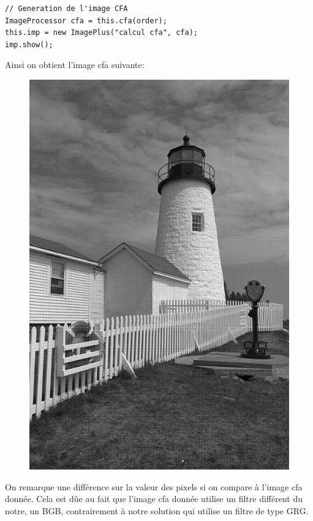 \documentclass[a4paper,12pt]{report}
\begin{document}
\begin{lstlisting}[style=Java]
// Generation de l'image CFA
ImageProcessor cfa = this.cfa(order);
this.imp = new ImagePlus("calcul cfa", cfa);
imp.show();
\end{lstlisting}

Ainsi on obtient l'image cfa suivante:
\begin{figure}[!ht]
	\center
	\includegraphics[scale=0.3]{./image/part1-2.png}
\end{figure}

On remarque une différence sur la valeur des pixels si on compare à l'image cfa donnée. Cela est dûe au fait que l'image cfa donnée utilise un filtre différent du notre, un BGB, contrairement à notre solution qui utilise un filtre de type GRG.
\end{document}

